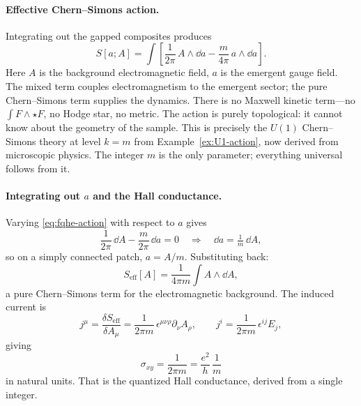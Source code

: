 \paragraph{Effective Chern--Simons action.}
Integrating out the gapped composites produces \cite{ZhangHanssonKivelson1989FQHE}
\begin{equation}
  S[a;A]
  =
  \int\left[
  \frac{1}{2\pi}\,A\wedge\dd a
  -
  \frac{m}{4\pi}\,a\wedge\dd a
  \right].
  \label{eq:fqhe-action}
\end{equation}
Here $A$ is the background electromagnetic field, $a$ is the emergent gauge field. The mixed term couples electromagnetism to the emergent sector; the pure Chern--Simons term supplies the dynamics. There is no Maxwell kinetic term---no $\int F\wedge\star F$, no Hodge star, no metric. The action is purely topological: it cannot know about the geometry of the sample. This is precisely the $U(1)$ Chern--Simons theory at level $k=m$ from Example~\ref{ex:U1-action}, now derived from microscopic physics. The integer $m$ is the only parameter; everything universal follows from it.

\paragraph{Integrating out $a$ and the Hall conductance.}
Varying \eqref{eq:fqhe-action} with respect to $a$ gives
\begin{equation}
  \frac{1}{2\pi}\,\dd A - \frac{m}{2\pi}\,\dd a = 0
  \quad\Longrightarrow\quad
  \dd a = \tfrac{1}{m}\,\dd A,
  \label{eq:fqhe-eom}
\end{equation}
so on a simply connected patch, $a = A/m$. Substituting back:
\begin{equation}
  S_{\mathrm{eff}}[A]
  =
  \frac{1}{4\pi m}\int A\wedge\dd A,
  \label{eq:fqhe-effective-action}
\end{equation}
a pure Chern--Simons term for the electromagnetic background. The induced current is
\begin{equation}
  j^\mu
  = \frac{\delta S_{\mathrm{eff}}}{\delta A_\mu}
  = \frac{1}{2\pi m}\,\epsilon^{\mu\nu\rho}\partial_\nu A_\rho,
  \qquad
  j^i = \frac{1}{2\pi m}\,\epsilon^{ij}E_j,
  \label{eq:fqhe-current}
\end{equation}
giving
\begin{equation}
  \sigma_{xy} = \frac{1}{2\pi m} = \frac{e^2}{h}\,\frac{1}{m}
  \label{eq:fqhe-conductance-derived}
\end{equation}
in natural units. That is the quantized Hall conductance, derived from a single integer.

